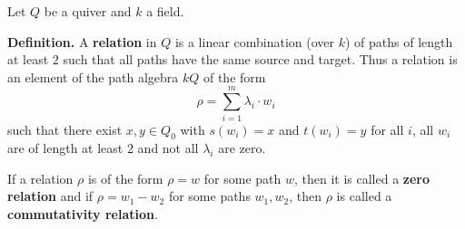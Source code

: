 \documentclass[12pt]{article}
\begin{document}
Let $Q$ be a quiver and $k$ a field.

\textbf{Definition.} A \textbf{relation} in $Q$ is a linear combination (over $k$) of paths of length at least $2$ such that all paths have the same source and target. Thus a relation is an element of the path algebra $kQ$ of the form
$$\rho=\sum_{i=1}^m\lambda_i\cdot w_i$$
such that there exist $x,y\in Q_0$ with $s(w_i)=x$ and $t(w_i)=y$ for all $i$, all $w_i$ are of length at least $2$ and not all $\lambda_i$ are zero.

If a relation $\rho$ is of the form $\rho=w$ for some path $w$, then it is called a \textbf{zero relation} and if $\rho=w_1-w_2$ for some paths $w_1,w_2$, then $\rho$ is called a \textbf{commutativity relation}.
\end{document}
